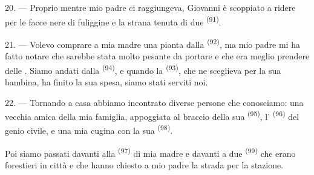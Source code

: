 20. --- Proprio mentre mio padre ci raggiungeva, Giovanni è scoppiato a ridere per le
facce nere di fuliggine e la strana tenuta di due 
\textsuperscript{(91)}.

21. --- Volevo comprare a mia madre una pianta dalla 
\textsuperscript{(92)}, ma mio padre mi ha fatto notare che sarebbe stata molto pesante
da portare e che era meglio prendere delle . Siamo andati dalla
 \textsuperscript{(94)}, e quando la 
\textsuperscript{(93)}, che ne sceglieva per la sua bambina, ha finito la sua spesa,
siamo stati serviti noi.

22. --- Tornando a casa abbiamo incontrato diverse persone che conosciamo: una vecchia
amica della mia famiglia, appoggiata al braccio della sua 
\textsuperscript{(95)}, l' \textsuperscript{(96)} del genio civile, e
una mia cugina con la sua  \textsuperscript{(98)}.

Poi siamo passati davanti alla  \textsuperscript{(97)} di mia madre e
davanti a due  \textsuperscript{(99)} che erano forestieri in città e che
hanno chiesto a mio padre la strada per la stazione.
\VUsaut{6.0mm}
\VUfilet{22mm}
